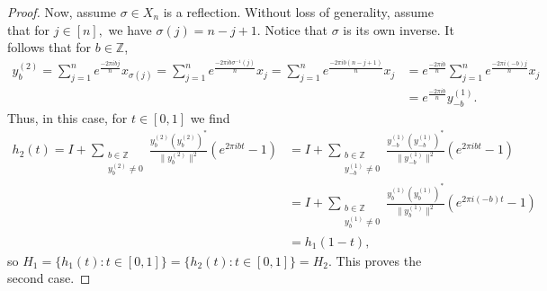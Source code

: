 \documentclass[reqno]{amsart}
\begin{document}
\begin{proof}
    Now, assume $\sigma \in X_n$ is a reflection.
    Without loss of generality, assume that for $j \in [n],$ we have $\sigma(j) = n-j+1$.
    Notice that $\sigma$ is its own inverse.
    It follows that for $b \in \mathbb{Z}$,
    \begin{align*}
    y_b^{(2)}
    =
    \sum_{j=1}^n e^{\frac{-2\pi ibj}{n}}x_{\sigma(j)}
    =
    \sum_{j=1}^n e^{\frac{-2\pi ib \sigma^{-1}(j)}{n}} x_j
    =
    \sum_{j=1}^n e^{\frac{-2\pi ib (n-j+1)}{n}} x_j
    &=
    e^{\frac{-2\pi ib}{n}}\sum_{j=1}^n e^{\frac{-2\pi i(-b)j}{n}}x_j
    \\&=
    e^{\frac{-2\pi ib}{n}} y_{-b}^{(1)}.
    \end{align*}
    Thus, in this case, for $t \in [0,1]$ we find
    \begin{align*}
    h_2(t) 
    = 
    I +\sum_{\substack{b \in \mathbb{Z} \\ y^{(2)}_b \neq 0}} 
    \frac{y^{(2)}_b (y^{(2)}_b)^*}{\|y^{(2)}_b\|^2}(e^{2\pi ibt} -1)
    &=
    I +\sum_{\substack{b \in \mathbb{Z} \\ y^{(1)}_{-b} \neq 0}} 
    \frac{y^{(1)}_{-b} (y^{(1)}_{-b})^*}{\|y^{(1)}_{-b}\|^2}(e^{2\pi ibt} -1)
    \\&=
    I +\sum_{\substack{b \in \mathbb{Z} \\ y^{(1)}_{b} \neq 0}} 
    \frac{y^{(1)}_{b} (y^{(1)}_{b})^*}{\|y^{(1)}_{b}\|^2}(e^{2\pi i(-b)t} -1)
    \\&=
    h_1(1-t),
    \end{align*}
    so $H_1 = \{h_1(t): t \in [0,1]\} = \{h_2(t) : t \in [0,1]\} = H_2$.
    This proves the second case.
\end{proof}
\end{document}
